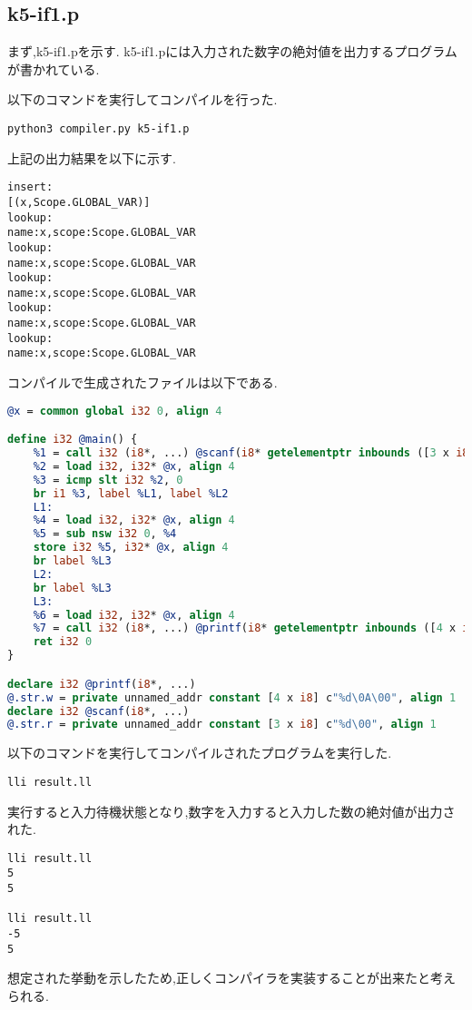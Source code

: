 \documentclass[main]{subfiles}
\begin{document}
\subsection{k5-if1.p}
まず,k5-if1.pを示す.
k5-if1.pには入力された数字の絶対値を出力するプログラムが書かれている.

以下のコマンドを実行してコンパイルを行った.
\begin{oframed}
\begin{verbatim}
python3 compiler.py k5-if1.p
\end{verbatim}
\end{oframed}
上記の出力結果を以下に示す.
\begin{lstlisting}[caption=python3 compiler.py k5-if1.pの出力]
insert:
[(x,Scope.GLOBAL_VAR)]
lookup:
name:x,scope:Scope.GLOBAL_VAR
lookup:
name:x,scope:Scope.GLOBAL_VAR
lookup:
name:x,scope:Scope.GLOBAL_VAR
lookup:
name:x,scope:Scope.GLOBAL_VAR
lookup:
name:x,scope:Scope.GLOBAL_VAR
\end{lstlisting}
コンパイルで生成されたファイルは以下である.
\begin{lstlisting}[caption=k5-if1.pのコンパイルで生成されたresult.ll,language=LLVM]
@x = common global i32 0, align 4

define i32 @main() {
    %1 = call i32 (i8*, ...) @scanf(i8* getelementptr inbounds ([3 x i8], [3 x i8]* @.str.r, i64 0, i64 0), i32* @x)
    %2 = load i32, i32* @x, align 4
    %3 = icmp slt i32 %2, 0
    br i1 %3, label %L1, label %L2
    L1:
    %4 = load i32, i32* @x, align 4
    %5 = sub nsw i32 0, %4
    store i32 %5, i32* @x, align 4
    br label %L3
    L2:
    br label %L3
    L3:
    %6 = load i32, i32* @x, align 4
    %7 = call i32 (i8*, ...) @printf(i8* getelementptr inbounds ([4 x i8], [4 x i8]* @.str.w, i64 0, i64 0), i32 %6)
    ret i32 0
}

declare i32 @printf(i8*, ...)
@.str.w = private unnamed_addr constant [4 x i8] c"%d\0A\00", align 1
declare i32 @scanf(i8*, ...)
@.str.r = private unnamed_addr constant [3 x i8] c"%d\00", align 1
\end{lstlisting}
以下のコマンドを実行してコンパイルされたプログラムを実行した.
\begin{oframed}
\begin{verbatim}
lli result.ll
\end{verbatim}
\end{oframed}
実行すると入力待機状態となり,数字を入力すると入力した数の絶対値が出力された.
\begin{lstlisting}[caption=k5-if1.pをコンパイルしたプログラムを実行]
lli result.ll
5
5

lli result.ll
-5
5
\end{lstlisting}
想定された挙動を示したため,正しくコンパイラを実装することが出来たと考えられる.
\end{document}
